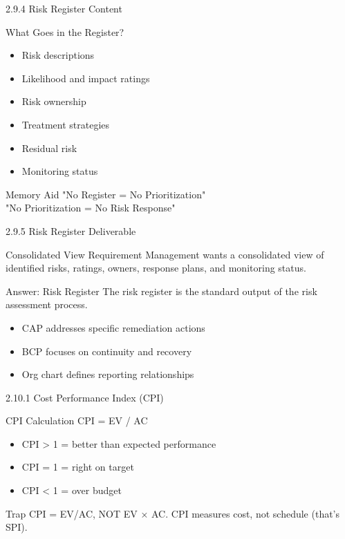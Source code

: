 \documentclass{beamer}
\begin{document}
	\begin{frame}{2.9.4 Risk Register Content}
		\begin{block}{What Goes in the Register?}
			\begin{itemize}
				\item Risk descriptions
				\item Likelihood and impact ratings
				\item Risk ownership
				\item Treatment strategies
				\item Residual risk
				\item Monitoring status
			\end{itemize}
		\end{block}
		\begin{alertblock}{Memory Aid}
			"No Register = No Prioritization" \\
			"No Prioritization = No Risk Response"
		\end{alertblock}
	\end{frame}
	
	\begin{frame}{2.9.5 Risk Register Deliverable}
		\begin{block}{Consolidated View Requirement}
			Management wants a consolidated view of identified risks, ratings, owners, response plans, and monitoring status.
		\end{block}
		\begin{exampleblock}{Answer: Risk Register}
			The risk register is the standard output of the risk assessment process.
		\end{exampleblock}
		\begin{itemize}
			\item CAP addresses specific remediation actions
			\item BCP focuses on continuity and recovery
			\item Org chart defines reporting relationships
		\end{itemize}
	\end{frame}
	
	\begin{frame}{2.10.1 Cost Performance Index (CPI)}
		\begin{block}{CPI Calculation}
			CPI = EV / AC
		\end{block}
		\begin{itemize}
			\item CPI > 1 = better than expected performance
			\item CPI = 1 = right on target
			\item CPI < 1 = over budget
		\end{itemize}
		\begin{alertblock}{Trap}
			CPI = EV/AC, NOT EV × AC. CPI measures cost, not schedule (that's SPI).
		\end{alertblock}
	\end{frame}
	
\end{document}
